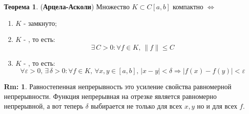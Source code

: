 \documentclass[12pt]{article}
\newcommand{\VE}{\varepsilon}
\theoremstyle{definition}
\newtheorem{rem}{Rm:}
\newtheorem{theorem}{Теорема}
\begin{document}
\begin{theorem}(\textbf{Арцела-Асколи})
	Множество $K \subset C[a,b]$ компактно $\Leftrightarrow$ 
	\begin{enumerate}[label={\arabic*)}]
		\item $K$ - замкнуто;
		\item $K$ - , то есть: 
		$$	
			\exists \, C > 0 \colon \forall f \in K, \, \|f\| \leq C
		$$
		\item $K$ - , то есть: 
		$$
			\forall \VE > 0, \, \exists \, \delta > 0 \colon \forall f \in K, \, \forall x,y \in [a,b],\,  |x - y| < \delta \Rightarrow  |f(x) - f(y)| < \VE
		$$
	\end{enumerate}
\end{theorem}
\begin{rem}
	Равностепенная непрерывность это усиление свойства равномерной непрерывности. Функция непрерывная на отрезке является равномерно непрерывной, а вот теперь $\delta$ выбирается не только для всех $x,y$ но и для всех $f$.
\end{rem}
\end{document}

